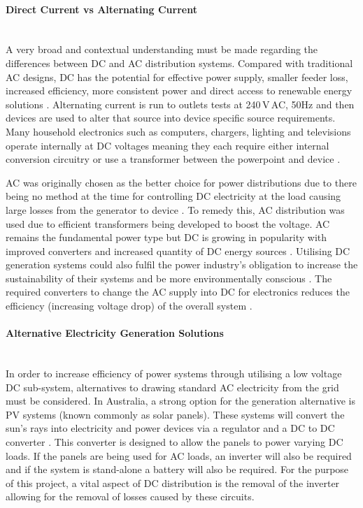 \paragraph{Direct Current vs Alternating Current}
~\\
A very broad and contextual understanding must be made regarding the differences between DC and AC distribution systems. Compared with traditional AC designs, DC has the potential for effective power supply, smaller feeder loss, increased efficiency, more consistent power and direct access to renewable energy solutions \cite{Liu2014}. Alternating current is run to outlets tests at 240\,V\,AC, 50\si{Hz} and then devices are used to alter that source into device specific source requirements. Many household electronics such as computers, chargers, lighting and televisions operate internally at DC voltages meaning they each require either internal conversion circuitry or use a transformer between the powerpoint and device \cite{Paajanen2009}.
\newline

AC was originally chosen as the better choice for power distributions due to there being no method at the time for controlling DC electricity at the load causing large losses from the generator to device \cite{Starke2008b}. To remedy this, AC distribution was used due to efficient transformers being developed to boost the voltage. AC remains the fundamental power type but DC is growing in popularity with improved converters and increased quantity of DC energy sources \cite{Starke2008b}. Utilising DC generation systems could also fulfil the power industry's obligation to increase the sustainability of their systems and be more environmentally conscious \cite{Starke2008a}. The required converters to change the AC supply into DC for electronics reduces the efficiency (increasing voltage drop) of the overall system \cite{Starke2008b}.  

\paragraph{Alternative Electricity Generation Solutions}
~\\
In order to increase efficiency of power systems through utilising a low voltage DC sub-system, alternatives to drawing standard AC electricity from the grid must be considered. In Australia, a strong option for the generation alternative is PV systems (known commonly as solar panels). These systems will convert the sun’s rays into electricity and power devices via a regulator and a DC to DC converter \cite{Pillay2004}. This converter is designed to allow the panels to power varying DC loads. If the panels are being used for AC loads, an inverter will also be required and if the system is stand-alone a battery will also be required. For the purpose of this project, a vital aspect of DC distribution is the removal of the inverter allowing for the removal of losses caused by these circuits.  

